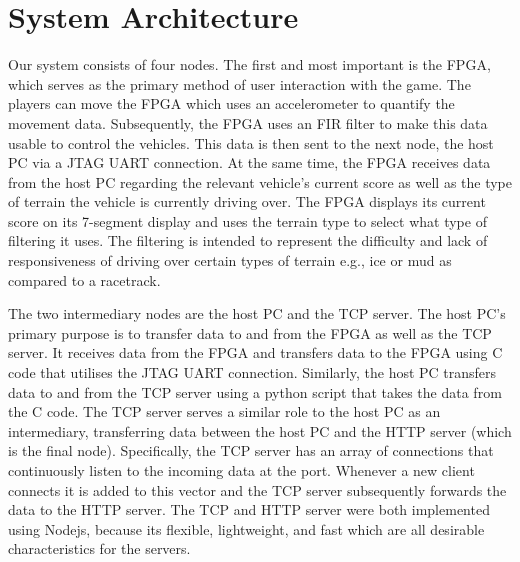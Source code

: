 \documentclass[12pt,a4paper]{article}
\begin{document}
\section{\small System Architecture}

{\scriptsize Our system consists of four nodes. The first and most important is the 
FPGA, which serves as the primary method of user interaction with the 
game. The players can move the FPGA which uses an accelerometer to quantify 
the movement data. Subsequently, the FPGA uses an FIR filter to make this 
data usable to control the vehicles. This data is then sent to the next node, 
the host PC via a JTAG UART connection. At the same time, the FPGA receives 
data from the host PC regarding the relevant vehicle’s current score as well 
as the type of terrain the vehicle is currently driving over. The FPGA displays 
its current score on its 7-segment display and uses the terrain type to select 
what type of filtering it uses. The filtering is intended to represent the 
difficulty and lack of responsiveness of driving over certain types of terrain 
e.g., ice or mud as compared to a racetrack.}
\par
{\scriptsize The two intermediary nodes are the host PC and the TCP server. The host PC’s 
primary purpose is to transfer data to and from the FPGA as well as the TCP 
server. It receives data from the FPGA and transfers data to the FPGA using 
C code that utilises the JTAG UART connection. Similarly, the host PC transfers 
data to and from the TCP server using a python script that takes the data from 
the C code. The TCP server serves a similar role to the host PC as an intermediary, 
transferring data between the host PC and the HTTP server (which is the final node). 
Specifically, the TCP server has an array of connections that continuously listen 
to the incoming data at the port. Whenever a new client connects it is added to 
this vector and the TCP server subsequently forwards the data to the HTTP server. 
The TCP and HTTP server were both implemented using Nodejs, because its flexible, 
lightweight, and fast which are all desirable characteristics for the servers.   }
\par
\end{document}

